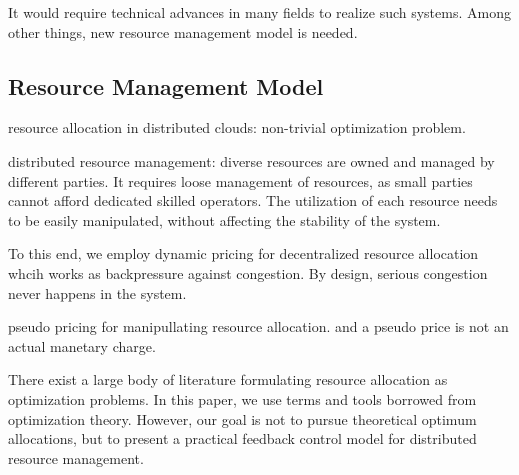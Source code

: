 It would require technical advances in many fields to realize such
systems.
Among other things, new resource management model is needed.



\subsection{Resource Management Model}

resource allocation in distributed clouds: non-trivial optimization
problem.

distributed resource management: diverse resources are owned and
managed by different parties.
It requires loose management of resources, as small parties cannot
afford dedicated skilled operators.
The utilization of each resource needs to be easily manipulated,
without affecting the stability of the system.

To this end, we employ dynamic pricing for decentralized resource
allocation whcih works as backpressure against congestion.
By design, serious congestion never happens in the system.

pseudo pricing for manipullating resource allocation.
and a pseudo price is not an actual manetary charge.

There exist a large body of literature formulating resource allocation
as optimization problems.
In this paper, we use terms and tools borrowed from optimization
theory. However, our goal is not to pursue theoretical optimum
allocations, but to present a practical feedback control model for
distributed resource management.


